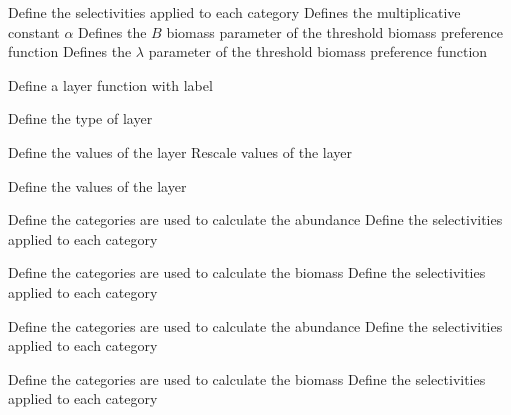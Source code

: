  {Define the selectivities applied to each category}
 {Defines the multiplicative constant $\alpha$}
 {Defines the $B$ biomass parameter of the threshold biomass preference function}
 {Defines the $\lambda$ parameter of the threshold biomass preference function}
\par{} {Define a layer function with label}\par
{} {Define the type of layer}
\par\textbf{}\par
{} {Define the values of the layer}
 {Rescale values of the layer}
\par\textbf{}\par
{} {Define the values of the layer}
\par\textbf{}\par
\par\textbf{}\par
{} {Define the categories are used to calculate the abundance}
 {Define the selectivities applied to each category}
\par\textbf{}\par
{} {Define the categories are used to calculate the biomass}
 {Define the selectivities applied to each category}
\par\textbf{}\par
{} {Define the categories are used to calculate the abundance}
 {Define the selectivities applied to each category}
\par\textbf{}\par
{} {Define the categories are used to calculate the biomass}
 {Define the selectivities applied to each category}
